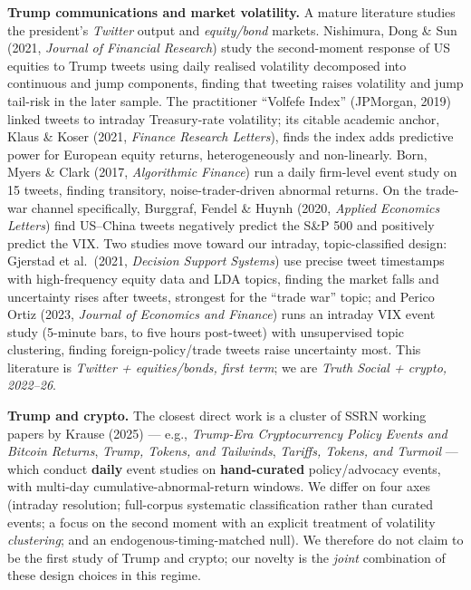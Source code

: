 \documentclass[
]{article}
\begin{document}
\textbf{Trump communications and market volatility.} A mature literature
studies the president's \emph{Twitter} output and \emph{equity/bond}
markets. Nishimura, Dong \& Sun (2021, \emph{Journal of Financial
Research}) study the second-moment response of US equities to Trump
tweets using daily realised volatility decomposed into continuous and
jump components, finding that tweeting raises volatility and jump
tail-risk in the later sample. The practitioner ``Volfefe Index''
(JPMorgan, 2019) linked tweets to intraday Treasury-rate volatility; its
citable academic anchor, Klaus \& Koser (2021, \emph{Finance Research
Letters}), finds the index adds predictive power for European equity
returns, heterogeneously and non-linearly. Born, Myers \& Clark (2017,
\emph{Algorithmic Finance}) run a daily firm-level event study on 15
tweets, finding transitory, noise-trader-driven abnormal returns. On the
trade-war channel specifically, Burggraf, Fendel \& Huynh (2020,
\emph{Applied Economics Letters}) find US--China tweets negatively
predict the S\&P 500 and positively predict the VIX. Two studies move
toward our intraday, topic-classified design: Gjerstad et al.~(2021,
\emph{Decision Support Systems}) use precise tweet timestamps with
high-frequency equity data and LDA topics, finding the market falls and
uncertainty rises after tweets, strongest for the ``trade war'' topic;
and Perico Ortiz (2023, \emph{Journal of Economics and Finance}) runs an
intraday VIX event study (5-minute bars, to five hours post-tweet) with
unsupervised topic clustering, finding foreign-policy/trade tweets raise
uncertainty most. This literature is \emph{Twitter + equities/bonds,
first term}; we are \emph{Truth Social + crypto, 2022--26}.

\textbf{Trump and crypto.} The closest direct work is a cluster of SSRN
working papers by Krause (2025) --- e.g., \emph{Trump-Era Cryptocurrency
Policy Events and Bitcoin Returns}, \emph{Trump, Tokens, and Tailwinds},
\emph{Tariffs, Tokens, and Turmoil} --- which conduct \textbf{daily}
event studies on \textbf{hand-curated} policy/advocacy events, with
multi-day cumulative-abnormal-return windows. We differ on four axes
(intraday resolution; full-corpus systematic classification rather than
curated events; a focus on the second moment with an explicit treatment
of volatility \emph{clustering}; and an endogenous-timing-matched null).
We therefore do not claim to be the first study of Trump and crypto; our
novelty is the \emph{joint} combination of these design choices in this
regime.
\end{document}
